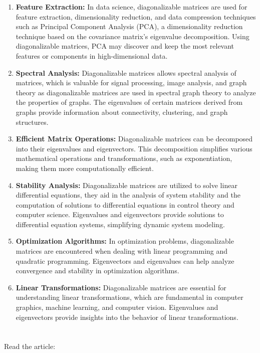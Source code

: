 \documentclass{article}
\begin{document}
\begin{enumerate}[label=\arabic*.]
\item \textbf{Feature Extraction:} In data science, diagonalizable matrices are used for feature extraction, dimensionality reduction, and data compression techniques such as Principal Component Analysis (PCA), a dimensionality reduction technique based on the covariance matrix's eigenvalue decomposition. Using diagonalizable matrices, PCA may discover and keep the most relevant features or components in high-dimensional data.
\item \textbf{Spectral Analysis:} Diagonalizable matrices allows spectral analysis of matrices, which is valuable for signal processing, image analysis, and graph theory as diagonalizable matrices are used in spectral graph theory to analyze the properties of graphs. The eigenvalues of certain matrices derived from graphs provide information about connectivity, clustering, and graph structures.
\item \textbf{Efficient Matrix Operations:} Diagonalizable matrices can be decomposed into their eigenvalues and eigenvectors. This decomposition simplifies various mathematical operations and transformations, such as exponentiation, making them more computationally efficient.
\item \textbf{Stability Analysis:} Diagonalizable matrices are utilized to solve linear differential equations, they aid in the analysis of system stability and the computation of solutions to differential equations in control theory and computer science. Eigenvalues and eigenvectors provide solutions to differential equation systems, simplifying dynamic system modeling.
\item \textbf{Optimization Algorithms:} In optimization problems, diagonalizable matrices are encountered when dealing with linear programming and quadratic programming. Eigenvectors and eigenvalues can help analyze convergence and stability in optimization algorithms.
\item \textbf{Linear Transformations:} Diagonalizable matrices are essential for understanding linear transformations, which are fundamental in computer graphics, machine learning, and computer vision. Eigenvalues and eigenvectors provide insights into the behavior of linear transformations.
\end{enumerate}

\section*{}
Read the article:
\end{document}
